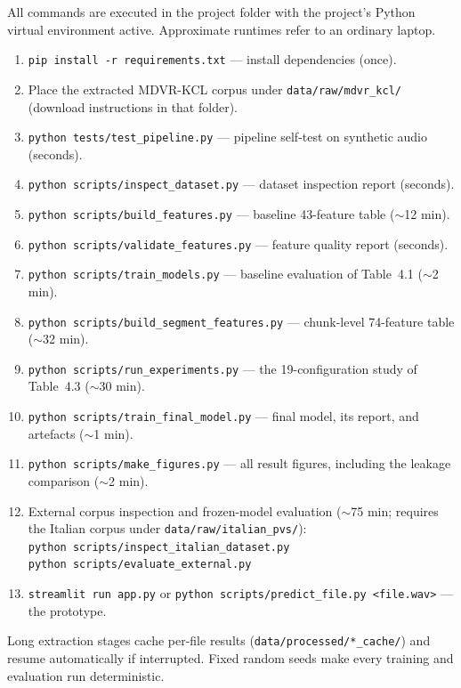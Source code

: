 All commands are executed in the project folder with the project's
Python virtual environment active. Approximate runtimes refer to an
ordinary laptop.

\begin{enumerate}
  \item \texttt{pip install -r requirements.txt} --- install
        dependencies (once).
  \item Place the extracted MDVR-KCL corpus under
        \texttt{data/raw/mdvr\_kcl/} (download instructions in that
        folder).
  \item \texttt{python tests/test\_pipeline.py} --- pipeline self-test
        on synthetic audio (seconds).
  \item \texttt{python scripts/inspect\_dataset.py} --- dataset
        inspection report (seconds).
  \item \texttt{python scripts/build\_features.py} --- baseline
        43-feature table ($\sim$12 min).
  \item \texttt{python scripts/validate\_features.py} --- feature
        quality report (seconds).
  \item \texttt{python scripts/train\_models.py} --- baseline
        evaluation of Table~4.1 ($\sim$2 min).
  \item \texttt{python scripts/build\_segment\_features.py} ---
        chunk-level 74-feature table ($\sim$32 min).
  \item \texttt{python scripts/run\_experiments.py} --- the
        19-configuration study of Table~4.3 ($\sim$30 min).
  \item \texttt{python scripts/train\_final\_model.py} --- final model,
        its report, and artefacts ($\sim$1 min).
  \item \texttt{python scripts/make\_figures.py} --- all result
        figures, including the leakage comparison ($\sim$2 min).
  \item External corpus inspection and frozen-model evaluation
        ($\sim$75 min; requires the Italian corpus under
        \texttt{data/raw/italian\_pvs/}):\\
        \texttt{python scripts/inspect\_italian\_dataset.py}\\
        \texttt{python scripts/evaluate\_external.py}
  \item \texttt{streamlit run app.py} or
        \texttt{python scripts/predict\_file.py <file.wav>} --- the
        prototype.
\end{enumerate}

Long extraction stages cache per-file results
(\texttt{data/processed/*\_cache/}) and resume automatically if
interrupted. Fixed random seeds make every training and evaluation
run deterministic.

